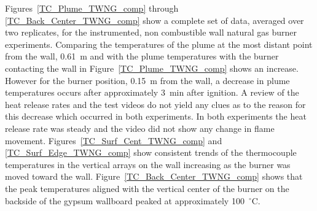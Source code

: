 \documentclass[twoside]{uocthesis}
\begin{document}
{Figures~\ref{TC_Plume_TWNG_comp} through \ref{TC_Back_Center_TWNG_comp} show a complete set of data, averaged over two replicates, for the instrumented, non combustible wall natural gas burner experiments.  Comparing the temperatures of the plume at the most distant point from the wall, 0.61~m and with the plume temperatures with the burner contacting the wall in Figure~\ref{TC_Plume_TWNG_comp} shows an increase.  However for the burner position, 0.15~m from the wall, a decrease in plume temperatures occurs after approximately 3~min after ignition.  A review of the heat release rates and the test videos do not yield any clues as to the reason for this decrease which occurred in both experiments.  In both experiments the heat release rate was steady and the video did not show any change in flame movement.
Figures~\ref{TC_Surf_Cent_TWNG_comp} and \ref{TC_Surf_Edge_TWNG_comp} show consistent trends of the thermocouple temperatures in the vertical arrays on the wall increasing as the burner was moved toward the wall.  Figure~\ref{TC_Back_Center_TWNG_comp} shows that the peak temperatures aligned with the vertical center of the burner on the backside of the gypsum wallboard peaked at approximately 100~$^\circ$C.


}
\end{document}
